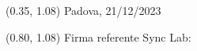 \documentclass{article}
\begin{document}
\begin{textblock*}{\textwidth}(0.35\textwidth, 1.08\textheight)
    Padova, 21/12/2023
\end{textblock*}

\begin{textblock*}{\textwidth}(0.80\textwidth, 1.08\textheight)
        Firma referente Sync Lab:
\end{textblock*}
\end{document}
